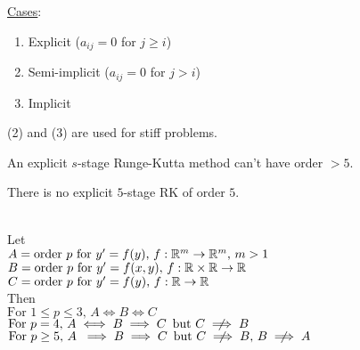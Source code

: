 \underline{Cases}:
\begin{enumerate}[label = (\arabic*)]
    \item Explicit ($a_{ij} = 0$ for $j\geq i$)
    \item Semi-implicit ($a_{ij} = 0$ for $j>i$)
    \item Implicit\-\\
\end{enumerate}
\begin{remark}
  (2) and (3) are used for stiff problems.
\end{remark}

\newpage

\begin{theorem}
  An explicit $s$-stage Runge-Kutta method can't have order $> 5$.
\end{theorem}

\begin{theorem}
  There is no explicit $5$-stage RK of order $5$.
\end{theorem}

\begin{theorem}\-\\

  Let \\
  
  \-\hspace{0.5cm}$A = \text{order } p \text{ for } y'=f(y), \, f:\mathbb{R}^m \to \mathbb{R}^m, \, m>1$\\
  \-\hspace{0.5cm}$B = \text{order } p \text{ for } y'=f(x,y), \, f:\mathbb{R}\times\mathbb{R} \to \mathbb{R}$\\
  \-\hspace{0.5cm}$C = \text{order } p \text{ for } y'=f(y), \, f:\mathbb{R} \to \mathbb{R}$\\
  
  Then\\
  
  \-\hspace{0.5cm}$\text{For }1\leq p\leq3, \, A\iff B \iff C$ \\
  \-\hspace{0.5cm}$\text{For }p = 4,        \, A\iff B \implies C \, \text{ but } C \centernot\implies B$\\
  \-\hspace{0.5cm}$\text{For }p \geq 5,     \, A\hspace{0.1cm}\implies B \implies C \, \text{ but } C \centernot\implies B, \, B \centernot\implies A$\\
\end{theorem}

